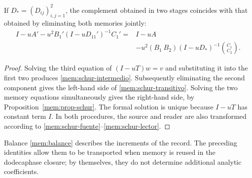 \begin{proposition}
If \(D_*=(D_{ij})_{i,j=1}^2\), the complement obtained in two stages
coincides with that obtained by eliminating both memories jointly:
\begin{equation}
 \begin{split}
 I-uA'-u^2B_1'(I-uD_{11}')^{-1}C_1'
 ={}&I-uA\\
 &-u^2(B_1\ B_2)(I-uD_*)^{-1}\binom{C_1}{C_2}.
 \end{split}
 \label{mem:schur-transitivo}
\end{equation}
\end{proposition}
\begin{proof}
Solving the third equation of \((I-uT)w=v\) and substituting it into the
first two produces \eqref{mem:schur-intermedio}. Subsequently eliminating the
second component gives the left-hand side of
\eqref{mem:schur-transitivo}. Solving the two memory equations simultaneously
gives the right-hand side, by Proposition~\ref{mem:prop-schur}.
The formal solution is unique because \(I-uT\) has constant term
\(I\). In both procedures, the source and reader are also transformed
according to \eqref{mem:schur-fuente}--\eqref{mem:schur-lector}.
\end{proof}

Balance \eqref{mem:balance} describes the increments of the record.
The preceding identities allow them to be transported when memory is reused
in the dodecaphase closure; by themselves, they do not determine additional
analytic coefficients.
